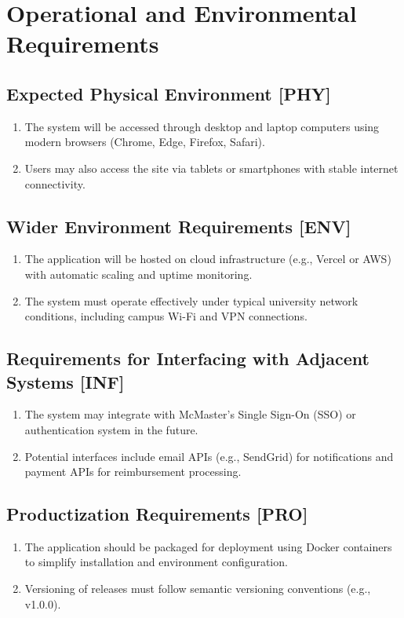 \documentclass[12pt]{article}
\begin{document}
\section{Operational and Environmental Requirements}
  \subsection{Expected Physical Environment [PHY]}
    \begin{enumerate}
      \item The system will be accessed through desktop and laptop computers using modern browsers (Chrome, Edge, Firefox, Safari).
      \item Users may also access the site via tablets or smartphones with stable internet connectivity.
    \end{enumerate}

  \subsection{Wider Environment Requirements [ENV]}
    \begin{enumerate}
      \item The application will be hosted on cloud infrastructure (e.g., Vercel or AWS) with automatic scaling and uptime monitoring.
      \item The system must operate effectively under typical university network conditions, including campus Wi-Fi and VPN connections.
    \end{enumerate}

  \subsection{Requirements for Interfacing with Adjacent Systems [INF]}
    \begin{enumerate}
      \item The system may integrate with McMaster's Single Sign-On (SSO) or authentication system in the future.
      \item Potential interfaces include email APIs (e.g., SendGrid) for notifications and payment APIs for reimbursement processing.
    \end{enumerate}

  \subsection{Productization Requirements [PRO]}
    \begin{enumerate}
      \item The application should be packaged for deployment using Docker containers to simplify installation and environment configuration.
      \item Versioning of releases must follow semantic versioning conventions (e.g., v1.0.0).
    \end{enumerate}
\end{document}
